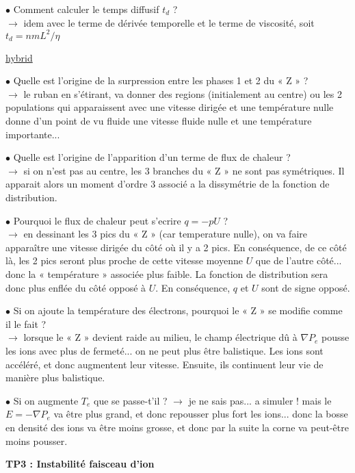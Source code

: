 \documentclass[10pt]{letter}
\begin{document}
$\bullet$ Comment calculer le temps diffusif $t_d$ ? \\
$\rightarrow$ idem avec le terme de dérivée temporelle et le terme de viscosité, soit $t_d = nmL^2/\eta$


\underline{\sc hybrid}

$\bullet$ Quelle est l'origine de la surpression entre les phases 1 et 2 du « Z » ? \\
$\rightarrow$ le ruban en s'étirant, va donner des regions (initialement au centre) ou les 2 populations qui apparaissent avec une vitesse dirigée et une température nulle donne d'un point de vu fluide une vitesse fluide nulle et une température importante...

$\bullet$ Quelle est l'origine de l'apparition d'un terme de flux de chaleur ? \\
$\rightarrow$ si on n'est pas au centre, les 3 branches du « Z » ne sont pas symétriques. Il apparait alors un moment d'ordre 3 associé a la dissymétrie de la fonction de distribution.

$\bullet$ Pourquoi le flux de chaleur peut s'ecrire $q=-pU$ ? \\
$\rightarrow$ en dessinant les 3 pics du « Z » (car temperature nulle), on va faire apparaître une vitesse dirigée du côté où il y a 2 pics. En conséquence, de ce côté là, les 2 pics seront plus proche de cette vitesse moyenne $U$ que de l'autre côté... donc la « température » associée plus faible. La fonction de distribution sera donc plus enflée du côté opposé à $U$. En conséquence, $q$ et $U$ sont de signe opposé.

$\bullet$ Si on ajoute la température des électrons, pourquoi le « Z » se modifie comme il le fait ? \\
$\rightarrow$ lorsque le « Z » devient raide au milieu, le champ électrique dû à $\nabla P_e$ pousse les ions avec plus de fermeté... on ne peut plus être balistique. Les ions sont accéléré, et donc augmentent leur vitesse. Ensuite, ils continuent leur vie de manière plus balistique.

$\bullet$ Si on augmente $T_e$ que se passe-t'il ?
$\rightarrow$ je ne sais pas... a simuler ! mais le $E = - \nabla P_e$ va être plus grand, et donc repousser plus fort les ions... donc la bosse en densité des ions va être moins grosse, et donc par la suite la corne va peut-être moins pousser.

\newpage

{\bf TP3 : Instabilité faisceau d'ion}

\bigskip
\end{document}
